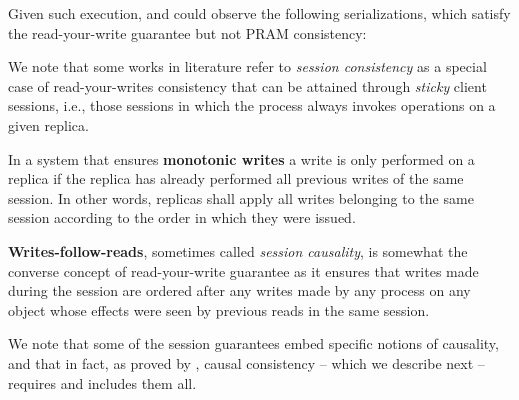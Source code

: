 \documentclass[letter, 11pt]{article}
\newcommand{\citeN}{\citet}
\begin{document}
\noindent Given such execution,  and  could observe the following serializations, 
which satisfy the read-your-write guarantee but not PRAM consistency:



We note that some works in literature refer to \emph{session consistency} as a special case of
read-your-writes consistency that can be attained through \emph{sticky} client sessions, i.e., those sessions in which the process always invokes operations on a given replica.

In a system that ensures \textbf{monotonic writes} a write is only performed on a replica if the replica has already performed all previous writes of the same session. 
In other words, replicas shall apply all writes belonging to the same session according to the order in which they were issued.



\textbf{Writes-follow-reads}, sometimes called \emph{session causality}, 
is somewhat the converse concept of read-your-write guarantee as it ensures that writes
made during the session are ordered after any writes made 
by any process on any object whose effects were seen by previous reads in the same session.


We note that some of the session guarantees embed specific notions of causality, 
and that in fact, as proved by \citeN{Brzezinski.ea:04},
causal consistency -- which we describe next -- requires and includes them all.
\end{document}
